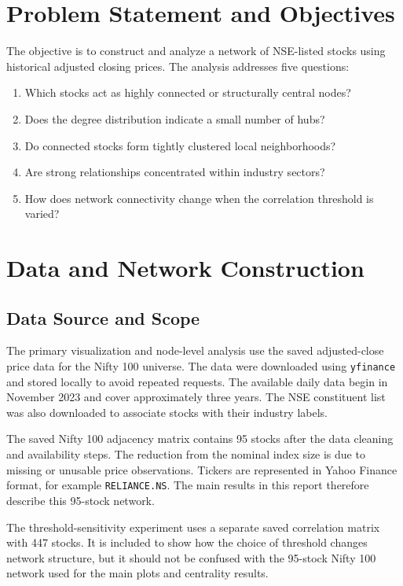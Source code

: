 \documentclass[12pt]{article}
\numberwithin{equation}{section}
\begin{document}
\section{Problem Statement and Objectives}
The objective is to construct and analyze a network of NSE-listed stocks using
historical adjusted closing prices. The analysis addresses five questions:
\begin{enumerate}
  \item Which stocks act as highly connected or structurally central nodes?
  \item Does the degree distribution indicate a small number of hubs?
  \item Do connected stocks form tightly clustered local neighborhoods?
  \item Are strong relationships concentrated within industry sectors?
  \item How does network connectivity change when the correlation threshold is
  varied?
\end{enumerate}

\section{Data and Network Construction}
\subsection{Data Source and Scope}
The primary visualization and node-level analysis use the saved adjusted-close
price data for the Nifty 100 universe. The data were downloaded using
\texttt{yfinance} and stored locally to avoid repeated requests. The available
daily data begin in November 2023 and cover approximately three years. The
NSE constituent list was also downloaded to associate stocks with their
industry labels.

The saved Nifty 100 adjacency matrix contains 95 stocks after the data
cleaning and availability steps. The reduction from the nominal index size is
due to missing or unusable price observations. Tickers are represented in
Yahoo Finance format, for example \texttt{RELIANCE.NS}. The main results in
this report therefore describe this 95-stock network.

The threshold-sensitivity experiment uses a separate saved correlation matrix
with 447 stocks. It is included to show how the choice of threshold changes
network structure, but it should not be confused with the 95-stock Nifty 100
network used for the main plots and centrality results.
\end{document}
